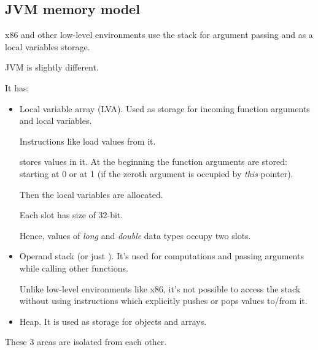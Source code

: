 \subsection{\ac{JVM} memory model}

x86 and other low-level environments use the stack for argument passing and 
as a local variables storage.

\ac{JVM} is slightly different.

It has:

\begin{itemize}
\item Local variable array (\ac{LVA}).
Used as storage for incoming function arguments and local variables.

Instructions like  load values from it.

 stores values in it.
At the beginning the function arguments are stored: starting at 0 or at 1 
(if the zeroth argument is occupied by \emph{this} pointer).

Then the local variables are allocated.


Each slot has size of 32-bit.

Hence, values of \emph{long} and \emph{double} data types occupy two slots.


\item Operand stack (or just ).
It's used for computations and passing arguments while calling other functions.

Unlike low-level environments like x86, it's not possible to access the stack without using
instructions which explicitly pushes or pops values to/from it.


\item Heap. It is used as storage for objects and arrays.

\end{itemize}

These 3 areas are isolated from each other.

